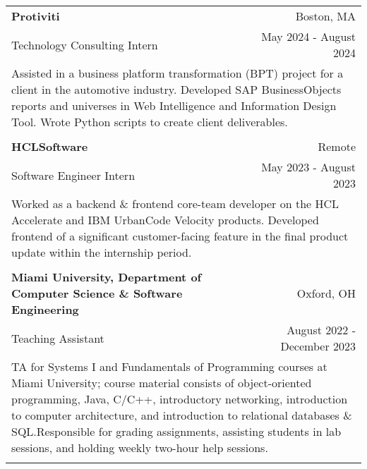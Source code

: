 \documentclass[letterpaper,8pt]{article} %
\begin{document}
\footnotesize{
\begin{tabular*}{\linewidth}{@{\extracolsep{\fill}} lr }

\textbf{Protiviti} & \footnotesize{Boston, MA}\\
\footnotesize{Technology Consulting Intern} & \footnotesize{May 2024 - August 2024}\\
\multicolumn{2}{p{\linewidth}}{\footnotesize{Assisted in a business platform transformation (BPT) project for a client in the automotive industry. Developed SAP BusinessObjects reports and universes in Web Intelligence and Information Design Tool. Wrote Python scripts to create client deliverables.}}\\
\multicolumn{2}{c}{} \\

\textbf{HCLSoftware} & \footnotesize{Remote}\\
\footnotesize{Software Engineer Intern} & \footnotesize{May 2023 - August 2023}\\
\multicolumn{2}{p{\linewidth}}{\footnotesize{Worked as a backend \& frontend core-team developer on the HCL Accelerate and IBM UrbanCode Velocity products. Developed frontend of a significant customer-facing feature in the final product update within the internship period.}}\\
\multicolumn{2}{c}{} \\

    
\textbf{Miami University, Department of Computer Science \& Software Engineering} & \footnotesize{Oxford, OH}\\
\footnotesize{Teaching Assistant} & \footnotesize{August 2022 - December 2023}\\
\multicolumn{2}{p{\linewidth}}{\footnotesize{TA for Systems I and Fundamentals of Programming courses at Miami University; course material consists of object-oriented programming, Java, C/C++, introductory networking, introduction to computer architecture, and introduction to relational databases \& SQL.\@ Responsible for grading assignments, assisting students in lab sessions, and holding weekly two-hour help sessions.}}\\
\multicolumn{2}{c}{} \\


\end{tabular*}}
\end{document}
